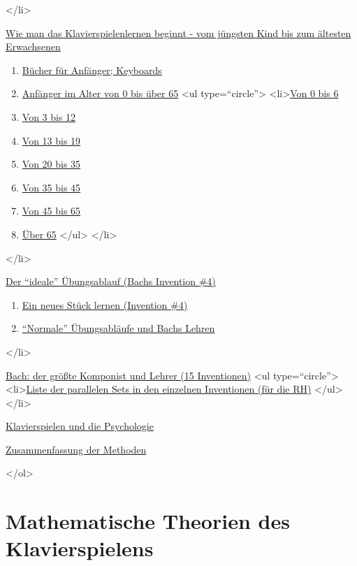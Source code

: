 </li>
 \item \hyperref[c1iii18]{Wie man das Klavierspielenlernen beginnt - vom jüngsten Kind bis zum ältesten Erwachsenen}
     \begin{enumerate}[label={\alph*.}] 
        <li>\hyperref[c1iii18a]{Benötigt man einen Lehrer?}
        \item \hyperref[c1iii18b]{Bücher für Anfänger; Keyboards}
        \item \hyperref[c1iii18c]{Anfänger im Alter von 0 bis über 65}
            <ul type=\enquote{circle}>
               <li>\hyperref[c1iii18c0]{Von 0 bis 6}
               \item \hyperref[c1iii18c3]{Von 3 bis 12}
               \item \hyperref[c1iii18c13]{Von 13 bis 19}
               \item \hyperref[c1iii18c20]{Von 20 bis 35}
               \item \hyperref[c1iii18c35]{Von 35 bis 45}
               \item \hyperref[c1iii18c45]{Von 45 bis 65}
               \item \hyperref[c1iii18c65]{Über 65}
            </ul>
        </li>
      \end{enumerate}
 </li>
 \item \hyperref[c1iii19]{Der \enquote{ideale} Übungsablauf (Bachs Invention \#4)}
     \begin{enumerate}[label={\alph*.}] 
        <li>\hyperref[c1iii19a]{Die Regeln lernen}
        \item \hyperref[c1iii19b]{Ein neues Stück lernen (Invention \#4)}
        \item \hyperref[c1iii19c]{\enquote{Normale} Übungsabläufe und Bachs Lehren}
      \end{enumerate}
 </li>
 \item \hyperref[c1iii20]{Bach: der größte Komponist und Lehrer (15 Inventionen)}
   <ul type=\enquote{circle}>
    <li>\hyperref[c1iii20ps]{Liste der parallelen Sets in den einzelnen Inventionen (für die RH)}
   </ul>
 </li>
 \item \hyperref[c1iii21]{Klavierspielen und die Psychologie}
 \item \hyperref[c1iii22]{Zusammenfassung der Methoden}

</ol>

\section{Mathematische Theorien des Klavierspielens}

